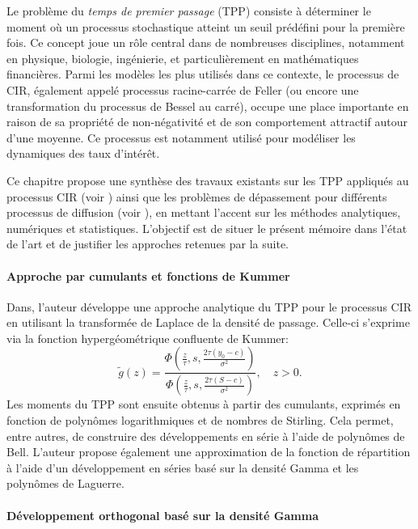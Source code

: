 \label{sec:RevLitt}

Le problème du \textit{temps de premier passage} (\acs{TPP}) consiste à déterminer le moment où un processus stochastique atteint un seuil prédéfini pour la première fois. Ce concept joue un rôle central dans de nombreuses disciplines, notamment en physique, biologie, ingénierie, et particulièrement en mathématiques financières. Parmi les modèles les plus utilisés dans ce contexte, le processus de \ac{CIR}, également appelé processus racine-carrée de Feller (ou encore une transformation du processus de Bessel au carré), occupe une place importante en raison de sa propriété de non-négativité et de son comportement attractif autour d'une moyenne. Ce processus est notamment utilisé pour modéliser les dynamiques des taux d'intérêt.

Ce chapitre propose une synthèse des travaux existants sur les \acs{TPP} appliqués au processus \acs{CIR} (voir \cite{dinardo2021,dinardo2024,kepplinger2017,giorno2021,giorno2023,martin2011,masoliver2012}) ainsi que les problèmes de dépassement pour différents processus de diffusion (voir \cite{kou2003,yin2014,kluppelberg2004}), en mettant l'accent sur les méthodes analytiques, numériques et statistiques. L'objectif est de situer le présent mémoire dans l'état de l'art et de justifier les approches retenues par la suite.

\paragraph{Approche par cumulants et fonctions de Kummer}

Dans\cite{dinardo2021}, l'auteur développe une approche analytique du \acs{TPP} pour le processus \acs{CIR} en utilisant la transformée de Laplace de la densité de passage. Celle-ci s'exprime via la fonction hypergéométrique confluente de Kummer:
\[
\tilde{g}(z) = \frac{\Phi\left(\frac{z}{\tau}, s, \frac{2\tau(y_0-c)}{\sigma^2}\right)}{\Phi\left(\frac{z}{\tau}, s, \frac{2\tau(S-c)}{\sigma^2}\right)}, \quad z > 0.
\]
Les moments du \acs{TPP} sont ensuite obtenus à partir des cumulants, exprimés en fonction de polynômes logarithmiques et de nombres de Stirling. Cela permet, entre autres, de construire des développements en série à l'aide de polynômes de Bell. L'auteur propose également une approximation de la fonction de répartition à l'aide d'un développement en séries basé sur la densité Gamma et les polynômes de Laguerre.

\paragraph{Développement orthogonal basé sur la densité Gamma}

